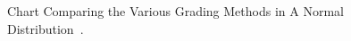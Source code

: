  \begin{figure}[!ht]
	\begin{center}
		\caption{Chart Comparing the Various Grading Methods in A Normal Distribution~\cite{normaldistribution}.}
		\label{figure-normal_distribution}
	\end{center}
\end{figure}
